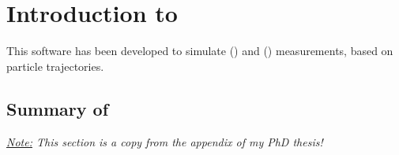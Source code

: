 \chapter{Introduction to \df}
\label{sec:IntroductionToDf}
This software has been developed to simulate  () and  () measurements, based on particle trajectories.



\section{Summary of \df}
\label{sec:SummaryOfDf}
\begin{center}
  \itshape \underline{Note:} This section is a copy from the appendix of my PhD thesis!
\end{center}


